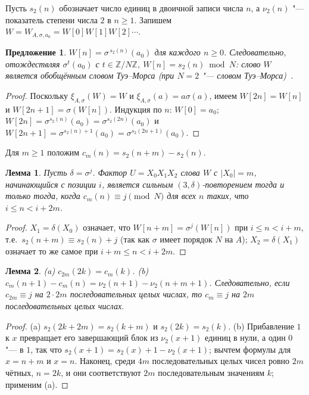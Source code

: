 \documentclass[a4paper,14pt]{extreport}
\theoremstyle{plain}
\newtheorem{lemma}{Лемма}[section]
\newtheorem{proposition}[theorem]{Предложение}
\theoremstyle{definition}
\theoremstyle{remark}
\begin{document}
Пусть $s_2(n)$ обозначает число единиц в двоичной записи числа $n$, а $\nu_2(n)$ "--- показатель степени числа $2$ в $n\ge1$.
Запишем $W=W_{A,\sigma,a_0}=W[0]W[1]W[2]\cdots$.

\begin{proposition}\label{prop:gTM}
	$W[n]=\sigma^{\,s_2(n)}(a_0)$ для каждого $n\ge0$. Следовательно, отождествляя $\sigma^t(a_0)$ с $t\in\mathbb Z/N\mathbb Z$,
	$W[n]=s_2(n) \bmod N$: слово $W$ является обобщённым словом Туэ--Морса (при $N=2$ "--- словом Туэ--Морса)~\cite{Allouche}.
\end{proposition}
\begin{proof}
	Поскольку $\xi_{A,\sigma}(W)=W$ и $\xi_{A,\sigma}(a)=a\sigma(a)$, имеем $W[2n]=W[n]$ и $W[2n+1]=\sigma(W[n])$.
	Индукция по $n$: $W[0]=a_0$; $W[2n]=\sigma^{s_2(n)}(a_0)=\sigma^{s_2(2n)}(a_0)$ и
	$W[2n+1]=\sigma^{s_2(n)+1}(a_0)=\sigma^{s_2(2n+1)}(a_0)$.
\end{proof}

Для $m\ge1$ положим $c_m(n)=s_2(n+m)-s_2(n)$.

\begin{lemma}\label{lem:arith}
	Пусть $\delta=\sigma^j$. Фактор $U=X_0X_1X_2$ слова $W$ с $|X_0|=m$, начинающийся с позиции $i$, является сильным $(3,\delta)$-повторением
	тогда и только тогда, когда $c_m(n)\equiv j \pmod N$ для всех $n$ таких, что $i\le n<i+2m$.
\end{lemma}
\begin{proof}
	$X_1=\delta(X_0)$ означает, что $W[n+m]=\sigma^j(W[n])$ при $i\le n<i+m$, т.е.\ $s_2(n+m)\equiv s_2(n)+j$ (так как $\sigma$ имеет порядок $N$ на $A$);
	$X_2=\delta(X_1)$ означает то же самое при $i+m\le n<i+2m$.
\end{proof}

\begin{lemma}\label{lem:half}
	(a) $c_{2m}(2k)=c_m(k)$. (b) $c_m(n+1)-c_m(n)=\nu_2(n+1)-\nu_2(n+m+1)$.
	Следовательно, если $c_{2m}\equiv j$ на $2\cdot 2m$ последовательных целых числах, то $c_m\equiv j$ на $2m$ последовательных целых числах.
\end{lemma}
\begin{proof}
	(a) $s_2(2k+2m)=s_2(k+m)$ и $s_2(2k)=s_2(k)$. (b) Прибавление $1$ к $x$ превращает его завершающий блок из $\nu_2(x+1)$ единиц в нули, а один $0$ "--- в $1$,
	так что $s_2(x+1)=s_2(x)+1-\nu_2(x+1)$; вычтем формулы для $x=n+m$ и $x=n$. Наконец, среди $4m$ последовательных целых чисел ровно $2m$ чётных, $n=2k$,
	и они соответствуют $2m$ последовательным значениям $k$; применим (a).
\end{proof}
\end{document}
